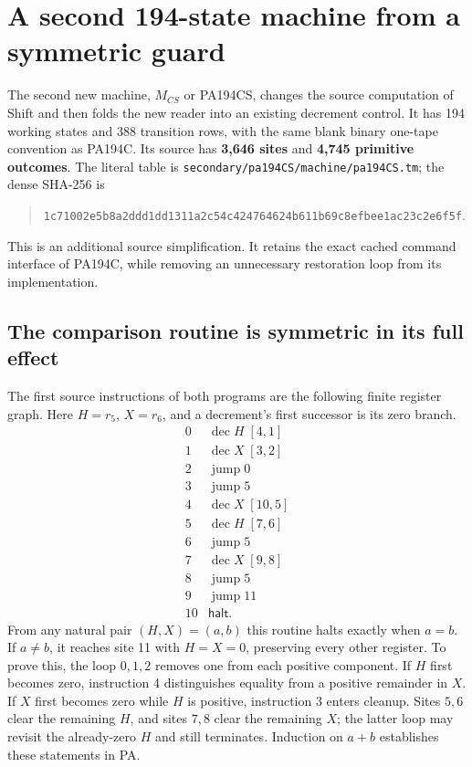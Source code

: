 \section{A second 194-state machine from a symmetric guard}
\label{sec:symmetric194}

The second new machine, $M_{CS}$ or PA194CS, changes the source computation
of Shift and then folds the new reader into an existing decrement control.
It has 194 working states and 388 transition rows, with the same blank
binary one-tape convention as PA194C. Its source has \textbf{3,646 sites}
and \textbf{4,745 primitive outcomes}. The literal table is
\texttt{secondary/pa194CS/machine/pa194CS.tm}; the dense SHA-256 is
\begin{quote}\small
\nolinkurl{1c71002e5b8a2ddd1dd1311a2c54c424764624b611b69c8efbee1ac23c2e6f5f}.
\end{quote}
This is an additional source simplification. It retains the exact cached
command interface of PA194C, while removing an unnecessary restoration
loop from its implementation.

\subsection{The comparison routine is symmetric in its full effect}

The first source instructions of both programs are the following finite
register graph. Here $H=r_5$, $X=r_6$, and a decrement's first successor
is its zero branch.
\[
\begin{array}{r|l}
0&\operatorname{dec}H\;[4,1]\\
1&\operatorname{dec}X\;[3,2]\\
2&\operatorname{jump}0\\
3&\operatorname{jump}5\\
4&\operatorname{dec}X\;[10,5]\\
5&\operatorname{dec}H\;[7,6]\\
6&\operatorname{jump}5\\
7&\operatorname{dec}X\;[9,8]\\
8&\operatorname{jump}5\\
9&\operatorname{jump}11\\
10&\mathsf{halt}.
\end{array}
\]
From any natural pair $(H,X)=(a,b)$ this routine halts exactly when $a=b$.
If $a\ne b$, it reaches site 11 with $H=X=0$, preserving every other
register. To prove this, the loop $0,1,2$ removes one from each positive
component. If $H$ first becomes zero, instruction 4 distinguishes equality
from a positive remainder in $X$. If $X$ first becomes zero while $H$ is
positive, instruction 3 enters cleanup. Sites $5,6$ clear the remaining
$H$, and sites $7,8$ clear the remaining $X$; the latter loop may revisit
the already-zero $H$ and still terminates. Induction on $a+b$ establishes
these statements in PA.

